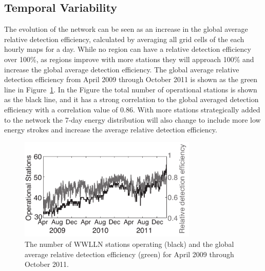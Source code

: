 \subsection{Temporal Variability}

The evolution of the network can be seen as an increase in the global average relative detection efficiency, calculated by averaging all grid cells of the each hourly maps for a day.
While no region can have a relative detection efficiency over 100\%, as regions improve with more stations they will approach 100\% and increase the global average detection efficiency.
The global average relative detection efficiency from April 2009 through October 2011 is shown as the green line in Figure~\ref{efficiency:fig:DE_Evolution}.
In the Figure the total number of operational stations is shown as the black line, and it has a strong correlation to the global averaged detection efficiency with a correlation value of 0.86.
With more stations strategically added to the network the 7-day energy distribution will also change to include more low energy strokes and increase the average relative detection efficiency.


\begin{figure}[ht!]
   \centering
\noindent\includegraphics[width=20pc]{efficiency/Figures/2012RS005049-p9.pdf} 
   \caption{The number of WWLLN stations operating (black) and the global average relative detection efficiency (green) for April 2009 through October 2011.}
   \label{efficiency:fig:DE_Evolution}
\end{figure}

